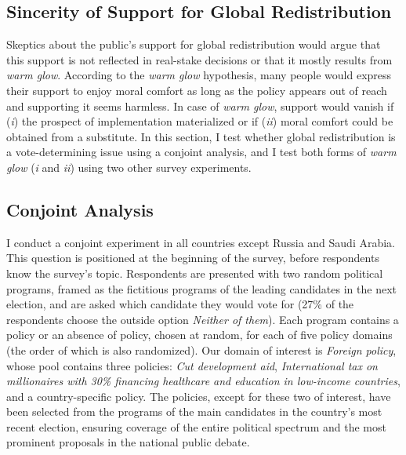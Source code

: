 \documentclass[12pt,english]{article}
\begin{document}
\begin{bibunit}
\section{Sincerity of Support for Global Redistribution\label{sec:sincerity}}

Skeptics about the public's support for global redistribution would argue that this support is not reflected in real-stake decisions or that it mostly results from \textit{warm glow}. According to the \textit{warm glow} hypothesis, many people would express their support to enjoy moral comfort as long as the policy appears out of reach and supporting it seems harmless. In case of \textit{warm glow}, support would vanish if (\textit{i}) the prospect of implementation materialized or if (\textit{ii}) moral comfort could be obtained from a substitute. In this section, I test whether global redistribution is a vote-determining issue using a conjoint analysis, and I test both forms of \textit{warm glow} (\textit{i} and \textit{ii}) using two other survey experiments.

\subsection{Conjoint Analysis}\label{subsec:conjoint}


I conduct a conjoint experiment in all countries except Russia and Saudi Arabia. This question is positioned at the beginning of the survey, before respondents know the survey's topic. Respondents are presented with two random political programs, framed as the fictitious programs of the leading candidates in the next election, and are asked which candidate they would vote for (27\% of the respondents choose the outside option \textit{Neither of them}). Each program contains a policy or an absence of policy, chosen at random, for each of five policy domains (the order of which is also randomized). %
Our domain of interest is \textit{Foreign policy}, whose pool contains three policies: \textit{Cut development aid}, \textit{International tax on millionaires with 30\% financing healthcare and education in low-income countries}, and a country-specific policy. %
The policies, except for these two of interest, have been selected from the programs of the main candidates in the country's most recent election, ensuring coverage of the entire political spectrum and the most prominent proposals in the national public debate. 


\end{bibunit}
\end{document}
